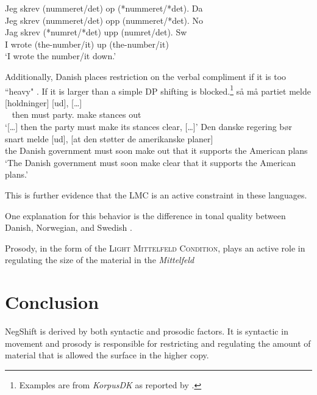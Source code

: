 \documentclass[12pt, letterpaper]{article}
\begin{document}
\ex \gllll Jeg skrev (nummeret/det) op (*nummeret/*det). \hfill Da\\
		Jeg skrev (nummeret/det) opp (nummeret/*det). \hfill No\\
		Jag skrev (*numret/*det) upp (numret/det). \hfill Sw\\
		I wrote (the-number/it) up (the-number/it)\\
\glt `I wrote the number/it down.'

\ex Additionally, Danish places restriction on the verbal compliment if it is too ``heavy" \citep[44f]{mullerDanishHeadDrivenPhraseInpreparation}. 
	\ea If it is larger than a simple DP shifting is blocked.\footnote{Examples are from \emph{KorpusDK} as reported by \citet{mullerDanishHeadDrivenPhraseInpreparation}.} 
	\ex \gll {[…]} så må partiet melde [holdninger] [ud], {[…]}\\
	~ then must party.\Def{} make stances out\\
	\glt `{[…]} then the party must make its stances clear, {[…]}'
	\ex \gll Den danske regering bør snart melde [ud], [at den støtter de amerikanske planer]\\
	the Danish government must soon make out that it supports the American plans\\
	\glt `The Danish government must soon make clear that it supports the American plans.'
	\z 

\ex This is further evidence that the LMC is an active constraint in these languages. 

\ex One explanation for this behavior is the difference in tonal quality between Danish, Norwegian, and Swedish \citep{erteschik-shirVariationMainlandScandinavian2020}.
\z 

\begin{tcolorbox}[width=\linewidth]

Prosody, in the form of the \textsc{Light Mittelfeld Condition}, plays an active role in regulating the size of the material in the \emph{Mittelfeld}
\end{tcolorbox}
\section{Conclusion} \label{sec:CONCLUSION}

\begin{tcolorbox}[width=\linewidth]
\centering
NegShift is derived by both syntactic and prosodic factors. It is syntactic in movement and prosody is responsible for restricting and regulating the amount of material that is allowed the surface in the higher copy.
\end{tcolorbox}
\end{document}

